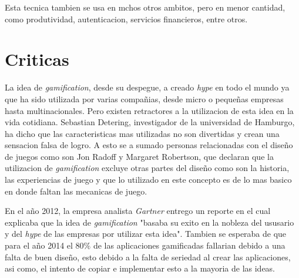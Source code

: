 Esta tecnica tambien se usa en mchos otros ambitos, pero en menor cantidad, como produtividad, 
autenticacion, servicios financieros, entre otros.

\section{Criticas}

La idea de \emph{gamification}, desde su despegue, a creado \emph{hype} en todo el mundo ya que ha sido
utilizada por varias compañias, desde micro o pequeñas empresas hasta multinacionales. Pero existen
 retractores a la utilizacion de esta idea en la vida cotidiana. Sebastian Detering, investigador de 
la universidad de Hamburgo, ha dicho que las caracteristicas mas utilizadas no son divertidas y crean 
una sensacion falsa de logro\cite{Gam:Crit:1}.
A esto se a sumado personas relacionadas con el diseño de juegos como son Jon Radoff y Margaret Robertson,
 que declaran que la utilizacion de \emph{gamification} excluye otras partes del diseño
como son la historia, las experiencias de juego y que lo utilizado en este concepto es de lo mas basico 
en donde faltan las mecanicas de juego\cite{Gam:Crit:2}.

En el año 2012, la empresa analista \emph{Gartner} entrego un reporte\cite{Gam:Crit:3} en el cual  
explicaba que la idea de \emph{gamification} "basaba su exito en la nobleza del ususario y del \emph{hype}
de las empresas por utilizar esta idea". Tambien se esperaba de que para el año 2014 el 80$\%$ de las aplicaciones
gamificadas fallarian debido a una falta de buen diseño, esto debido a la falta de seriedad al crear las 
aplicaciones, asi como, el intento de copiar e implementar esto a la mayoria de las ideas.

